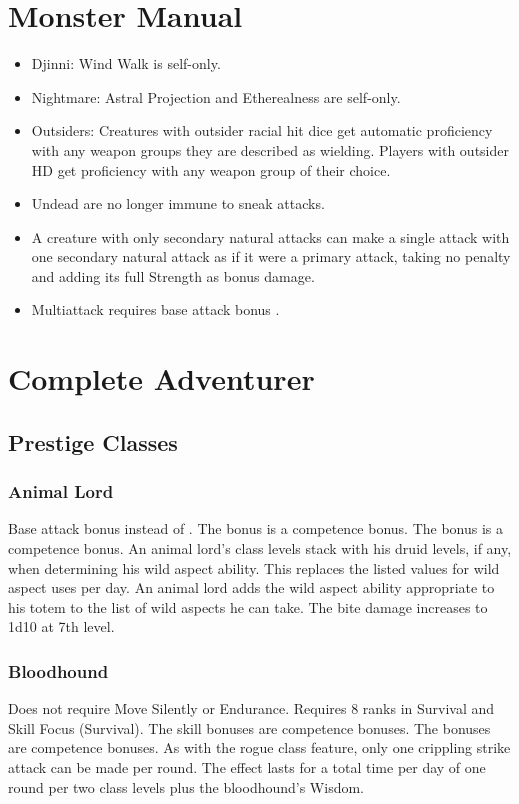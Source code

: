 \section{Monster Manual}
\begin{itemize}
\item Djinni: Wind Walk is self-only.
\item Nightmare: Astral Projection and Etherealness are self-only.
\item Outsiders: Creatures with outsider racial hit dice get automatic proficiency with any weapon groups they are described as wielding. Players with outsider HD get proficiency with any weapon group of their choice.
\item Undead are no longer immune to sneak attacks.
\item A creature with only secondary natural attacks can make a single attack with one secondary natural attack as if it were a primary attack, taking no penalty and adding its full Strength as bonus damage.
\item Multiattack requires base attack bonus .
\end{itemize}

\section{Complete Adventurer}
\subsection{Prestige Classes}
\subsubsection{Animal Lord}
 Base attack bonus  instead of .
 The bonus is a competence bonus.
 The bonus is a competence bonus.
 An animal lord's class levels stack with his druid levels, if any, when determining his wild aspect ability. This replaces the listed values for wild aspect uses per day. An animal lord adds the wild aspect ability appropriate to his totem to the list of wild aspects he can take.
 The bite damage increases to 1d10 at 7th level.
\subsubsection{Bloodhound}
 Does not require Move Silently or Endurance. Requires 8 ranks in Survival and Skill Focus (Survival).
 The skill bonuses are competence bonuses.
 The bonuses are competence bonuses.
 As with the rogue class feature, only one crippling strike attack can be made per round.
 The effect lasts for a total time per day of one round per two class levels plus the bloodhound's Wisdom.
